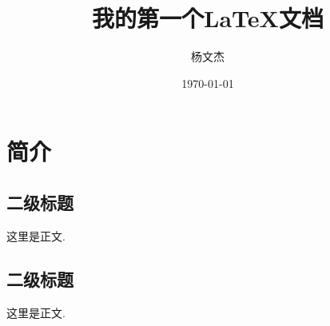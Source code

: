 \documentclass[12pt, a4paper]{ctexart}
\title{我的第一个\LaTeX 文档}
\author{杨文杰}
\date{\today}
\begin{document}
\maketitle

\section{简介}

\subsection{二级标题}

这里是正文. 

\subsection{二级标题}

这里是正文.
\end{document}
